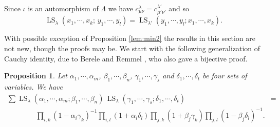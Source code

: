 \documentclass[11pt]{amsart}
\newcommand{\tmop}[1]{\ensuremath{\operatorname{#1}}}
\newtheorem{proposition}{Proposition}
\begin{document}
Since $\iota$ is an automorphism of $\Lambda$ we have $c_{\mu
\nu}^{\lambda} = c_{\mu' \nu'}^{\lambda'}$ and so
\begin{equation}
\label{interchange} \tmop{LS}_{\lambda} ( x_1, \cdots, x_k ; \,
y_1, \cdots, y_l ) = \tmop{LS}_{\lambda'} ( y_1, \cdots, y_l ;
x_1, \cdots, x_k ) .
\end{equation}

With possible exception of Proposition \ref{lem:min2} the results
in this section are not new, though the proofs may be. We start
with the following generalization of Cauchy identity, due to
Berele and Remmel \cite{BR85}, who also gave a bijective proof.

\begin{proposition}
\label{generalizedcauchy}Let $\alpha_1, \cdots, \alpha_m$,
$\beta_1, \cdots, \beta_n$, $\gamma_1, \cdots, \gamma_s$ and
$\delta_1, \cdots, \delta_t$ be four sets of variables. We have
\begin{eqnarray}
   \sum \tmop{LS}_{\lambda} ( \alpha_1, \cdots, \alpha_m ; \beta_1, \cdots,
   \beta_n ) \, \tmop{LS}_{\lambda} ( \gamma_1, \cdots, \gamma_s ; \delta_1,
   \cdots, \delta_t ) & = &  \nonumber\\\qquad\qquad
   \prod_{i, k} ( 1 - \alpha_i \gamma_k )^{- 1} \prod_{i, l} ( 1 + \alpha_i
   \delta_l ) \prod_{j, k} ( 1 + \beta_j \gamma_k ) \prod_{j, l} ( 1 -
   \beta_j \delta_l )^{- 1} . &  &  \label{gencauchyformula}
\end{eqnarray}
\end{proposition}
\end{document}
